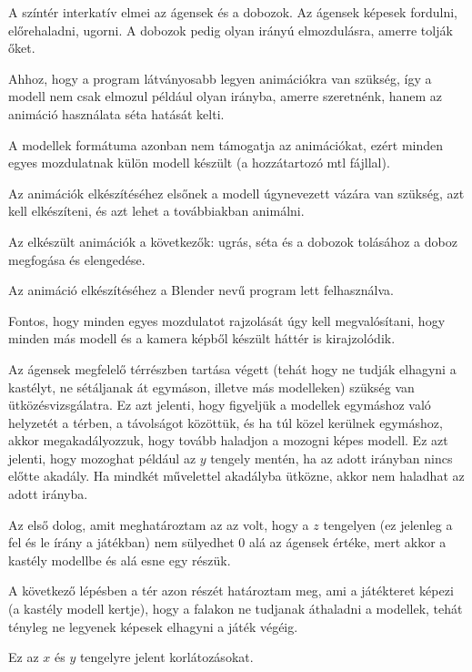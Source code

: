 
A színtér interkatív elmei az ágensek és a dobozok. 
Az ágensek képesek fordulni, előrehaladni, ugorni. 
A dobozok pedig olyan irányú elmozdulásra, amerre tolják őket.


Ahhoz, hogy a program látványosabb legyen animációkra van szükség, így a modell nem csak elmozul például olyan irányba, amerre szeretnénk, hanem az animáció használata séta hatását kelti.

A modellek formátuma azonban nem támogatja az animációkat, ezért minden egyes mozdulatnak külön modell készült (a hozzátartozó mtl fájllal).

Az animációk elkészítéséhez elsőnek a modell úgynevezett vázára van szükség, azt kell elkészíteni, és azt lehet a továbbiakban animálni. 
 
Az elkészült animációk a következők: ugrás, séta és a dobozok tolásához a doboz megfogása és elengedése.

Az animáció elkészítéséhez a Blender nevű program lett felhasználva. 

Fontos, hogy minden egyes mozdulatot rajzolását úgy kell megvalósítani, hogy minden más modell és a kamera képből készült háttér is kirajzolódik.
 

Az ágensek megfelelő térrészben tartása végett (tehát hogy ne tudják elhagyni a kastélyt, ne sétáljanak át egymáson, illetve más modelleken) szükség van ütközésvizsgálatra.
Ez azt jelenti, hogy figyeljük a modellek egymáshoz való helyzetét a térben, a távolságot közöttük, és ha túl közel kerülnek egymáshoz, akkor megakadályozzuk, hogy tovább haladjon a mozogni képes modell.
Ez azt jelenti, hogy  mozoghat  például az $y$ tengely mentén, ha az adott irányban nincs előtte akadály.
Ha mindkét művelettel akadályba ütközne, akkor nem haladhat az adott irányba.
 
Az első dolog, amit meghatároztam az az volt, hogy a $z$ tengelyen (ez jelenleg a fel és le írány a játékban) nem sülyedhet 0 alá az ágensek értéke, mert akkor a kastély modellbe és alá esne egy részük.

A következő lépésben a tér azon részét határoztam meg, ami a játékteret képezi (a kastély modell kertje), hogy a falakon ne tudjanak áthaladni a modellek, tehát tényleg ne legyenek képesek elhagyni a játék végéig.

Ez az $x$ és $y$ tengelyre jelent korlátozásokat.

